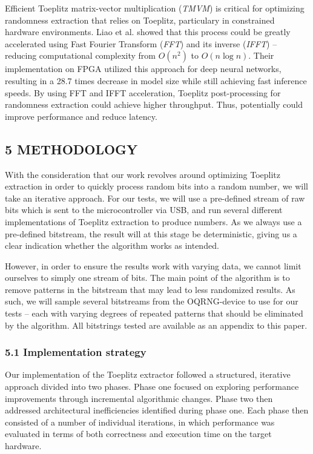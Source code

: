 \documentclass{sigchi}
\begin{document}
Efficient Toeplitz matrix-vector multiplication (\emph{TMVM}) is critical for optimizing randomness extraction that relies on Toeplitz, particulary in constrained hardware environments. Liao et al. \cite{liao} showed that this process could be greatly accelerated using Fast Fourier Transform (\emph{FFT}) and its inverse (\emph{IFFT}) -- reducing computational complexity from \(O(n^2)\) to \(O(n \log n)\). Their implementation on FPGA utilized this approach for deep neural networks, resulting in a 28.7 times decrease in model size while still achieving fast inference speeds. By using FFT and IFFT acceleration, Toeplitz post-processing for randomness extraction could achieve higher throughput. Thus, potentially could improve performance and reduce latency.

\subsection{5 METHODOLOGY}\label{methodology}

With the consideration that our work revolves around optimizing Toeplitz extraction in order to quickly process random bits into a random number, we will take an iterative approach. For our tests, we will use a pre-defined stream of raw bits which is sent to the microcontroller via USB, and run several different implementations of Toeplitz extraction to produce numbers. As we always use a pre-defined bitstream, the result will at this stage be deterministic, giving us a clear indication whether the algorithm works as intended.

However, in order to ensure the results work with varying data, we cannot limit ourselves to simply one stream of bits. The main point of the algorithm is to remove patterns in the bitstream that may lead to less randomized results. As such, we will sample several bitstreams from the OQRNG-device to use for our tests -- each with varying degrees of repeated patterns that should be eliminated by the algorithm. All bitstrings tested are available as an appendix to this paper.

\subsubsection{5.1 Implementation strategy}\label{implementation-strategy}

Our implementation of the Toeplitz extractor followed a structured, iterative approach divided into two phases. Phase one focused on exploring performance improvements through incremental algorithmic changes. Phase two then addressed architectural inefficiencies identified during phase one. Each phase then consisted of a number of individual iterations, in which performance was evaluated in terms of both correctness and execution time on the target hardware.
\end{document}
